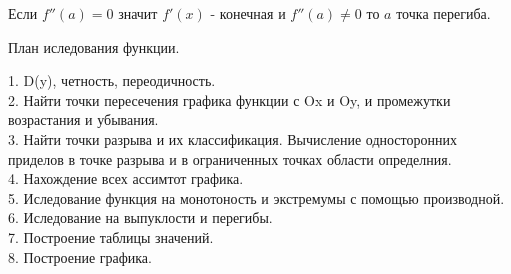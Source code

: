 \begin{theorem}
  Если $f''(a) = 0$ значит $f'(x)$ - конечная и $f''(a) \not= 0$ то
  $a$ точка перегиба.\\
\end{theorem}

\begin{title}[\Large]
  План иследования функции.
\end{title}
1. D(y), четность, переодичность.\\
2. Найти точки пересечения графика функции с Ox и Oy, и промежутки возрастания
  и убывания.\\
3. Найти точки разрыва и их классификация. Вычисление односторонних приделов
  в точке разрыва и в ограниченных точках области определния.\\
4. Нахождение всех ассимтот графика.\\
5. Иследование функция на монотоность и экстремумы с помощью производной.\\
6. Иследование на выпуклости и перегибы.\\
7. Построение таблицы значений.\\
8. Построение графика.\\